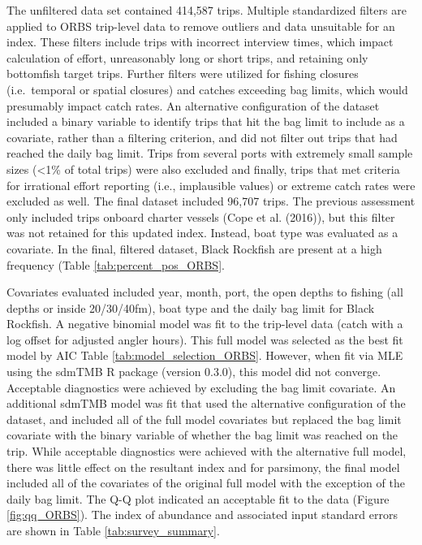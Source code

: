 \documentclass[11pt,
  english,
  letterpaper,
]{article}
\begin{document}
The unfiltered data set contained 414,587 trips. Multiple standardized filters are applied to ORBS trip-level data to remove outliers and data unsuitable for an index. These filters include trips with incorrect interview times, which impact calculation of effort, unreasonably long or short trips, and retaining only bottomfish target trips. Further filters were utilized for fishing closures (i.e.~temporal or spatial closures) and catches exceeding bag limits, which would presumably impact catch rates. An alternative configuration of the dataset included a binary variable to identify trips that hit the bag limit to include as a covariate, rather than a filtering criterion, and did not filter out trips that had reached the daily bag limit. Trips from several ports with extremely small sample sizes (\textless1\% of total trips) were also excluded and finally, trips that met criteria for irrational effort reporting (i.e., implausible values) or extreme catch rates were excluded as well. The final dataset included 96,707 trips. The previous assessment only included trips onboard charter vessels (Cope et al. (2016)), but this filter was not retained for this updated index. Instead, boat type was evaluated as a covariate. In the final, filtered dataset, Black Rockfish are present at a high frequency (Table \ref{tab:percent_pos_ORBS}.

Covariates evaluated included year, month, port, the open depths to fishing (all depths or inside 20/30/40fm), boat type and the daily bag limit for Black Rockfish. A negative binomial model was fit to the trip-level data (catch with a log offset for adjusted angler hours). This full model was selected as the best fit model by AIC Table \ref{tab:model_selection_ORBS}. However, when fit via MLE using the sdmTMB R package (version 0.3.0), this model did not converge. Acceptable diagnostics were achieved by excluding the bag limit covariate. An additional sdmTMB model was fit that used the alternative configuration of the dataset, and included all of the full model covariates but replaced the bag limit covariate with the binary variable of whether the bag limit was reached on the trip. While acceptable diagnostics were achieved with the alternative full model, there was little effect on the resultant index and for parsimony, the final model included all of the covariates of the original full model with the exception of the daily bag limit. The Q-Q plot indicated an acceptable fit to the data (Figure \ref{fig:qq_ORBS}). The index of abundance and associated input standard errors are shown in Table \ref{tab:survey_summary}.
\end{document}
